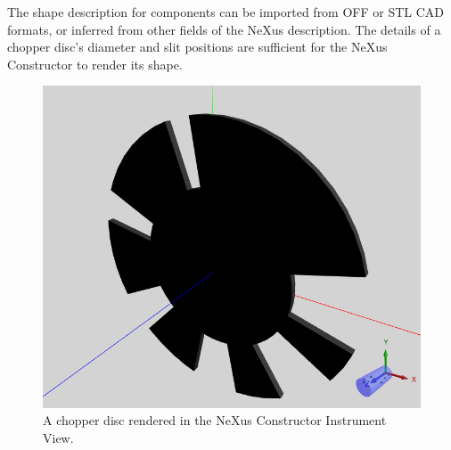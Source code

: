 The shape description for components can be imported from OFF or STL CAD formats, or inferred from other fields of the NeXus description.
The details of a chopper disc's diameter and slit positions are sufficient for the NeXus Constructor to render its shape.

\begin{figure}
	\includegraphics[width=0.6\linewidth]{chopperinstrumentview.png}
	\caption{A chopper disc rendered in the NeXus Constructor Instrument View.}
\end{figure}
